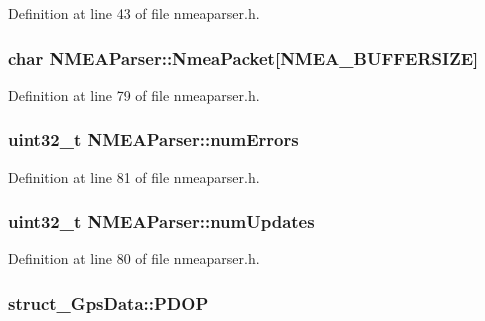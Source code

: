Definition at line 43 of file nmeaparser.\-h.

\hypertarget{group___g_p_s_gadget_plugin_ga3d1bdb9e4264f153e4537750bb8d7fd9}{
\subsubsection[{Nmea\-Packet}]{\setlength{\rightskip}{0pt plus 5cm}char N\-M\-E\-A\-Parser\-::\-Nmea\-Packet\mbox{[}N\-M\-E\-A\-\_\-\-B\-U\-F\-F\-E\-R\-S\-I\-Z\-E\mbox{]}}}\label{group___g_p_s_gadget_plugin_ga3d1bdb9e4264f153e4537750bb8d7fd9}


Definition at line 79 of file nmeaparser.\-h.

\hypertarget{group___g_p_s_gadget_plugin_gaef5bd2863b92f02db2ad4ef9e66e9437}{
\subsubsection[{num\-Errors}]{\setlength{\rightskip}{0pt plus 5cm}uint32\-\_\-t N\-M\-E\-A\-Parser\-::num\-Errors}}\label{group___g_p_s_gadget_plugin_gaef5bd2863b92f02db2ad4ef9e66e9437}


Definition at line 81 of file nmeaparser.\-h.

\hypertarget{group___g_p_s_gadget_plugin_ga08ee9a94774bf6691a26d600e1ea51a9}{
\subsubsection[{num\-Updates}]{\setlength{\rightskip}{0pt plus 5cm}uint32\-\_\-t N\-M\-E\-A\-Parser\-::num\-Updates}}\label{group___g_p_s_gadget_plugin_ga08ee9a94774bf6691a26d600e1ea51a9}


Definition at line 80 of file nmeaparser.\-h.

\hypertarget{group___g_p_s_gadget_plugin_ga686c0fa6dc1d7aa494b494fe38bb8834}{
\subsubsection[{P\-D\-O\-P}]{ struct\-\_\-\-Gps\-Data\-::\-P\-D\-O\-P}}\label{group___g_p_s_gadget_plugin_ga686c0fa6dc1d7aa494b494fe38bb8834}


